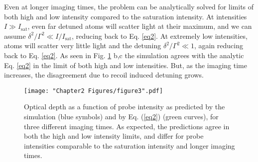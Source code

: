 Even at longer imaging times, the problem can be analytically solved for limits of both high and low intensity compared to the saturation intensity.  At intensities $I\gg I_{\mathrm{sat}}$, even far detuned atoms will scatter light at their maximum, and we can assume $\delta^2/\Gamma^2 \ll I/I_{\mathrm{sat}}$, reducing back to Eq. \ref{eq2}. At extremely low intensities, atoms will scatter very little light and the detuning $\delta^2/\Gamma^2 \ll 1$, again reducing back to Eq. \ref{eq2}. As seen in Fig. \ref{fig:IsatLimits} b,c the simulation agrees with the analytic Eq. \ref{eq2} in the limit of both high and low intensities. But, as the imaging time increases, the disagreement due to recoil induced detuning grows.
%
\begin{figure}
	\texttt{[image: "Chapter2 Figures/figure3".pdf]}
\caption[Optical depth as a function of probe intensity]{Optical depth as a function of probe intensity as predicted by the simulation (blue symbols) and by Eq. (\ref{eq2}) (green curves), for three different imaging times. As expected, the predictions agree in both the high and low intensity limits, and differ for probe intensities comparable to the saturation intensity and longer imaging times. }
\label{fig:IsatLimits}
\end{figure}

